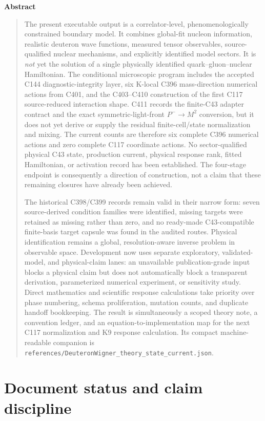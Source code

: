 \documentclass[11pt,oneside]{book}
\newcommand{\codepath}[1]{\nolinkurl{#1}}
\newenvironment{abstract}{%
  \clearpage\begin{center}\Large\bfseries Abstract\end{center}\begin{quote}
}{%
  \end{quote}\clearpage
}
\begin{document}
\begin{abstract}
The present executable output is a correlator-level, phenomenologically constrained boundary model.  It combines global-fit nucleon information, realistic deuteron wave functions, measured tensor observables, source-qualified nuclear mechanisms, and explicitly identified model sectors.  It is \emph{not} yet the solution of a single physically identified quark--gluon--nuclear Hamiltonian.  The conditional microscopic program includes the accepted C144 diagnostic-integrity layer, six K-local C396 mass-direction numerical actions from C401, and the C403--C410 construction of the first C117 source-reduced interaction shape.  C411 records the finite-C43 adapter contract and the exact symmetric-light-front $P^-\to M^2$ conversion, but it does not yet derive or supply the residual finite-cell/state normalization and mixing.  The current counts are therefore six complete C396 numerical actions and zero complete C117 coordinate actions.  No sector-qualified physical C43 state, production current, physical response rank, fitted Hamiltonian, or activation record has been established.  The four-stage endpoint is consequently a direction of construction, not a claim that these remaining closures have already been achieved.

The historical C398/C399 records remain valid in their narrow form: seven source-derived condition families were identified, missing targets were retained as missing rather than zero, and no ready-made C43-compatible finite-basis target capsule was found in the audited routes.  Physical identification remains a global, resolution-aware inverse problem in observable space.  Development now uses separate exploratory, validated-model, and physical-claim lanes: an unavailable publication-grade input blocks a physical claim but does not automatically block a transparent derivation, parameterized numerical experiment, or sensitivity study.  Direct mathematics and scientific response calculations take priority over phase numbering, schema proliferation, mutation counts, and duplicate handoff bookkeeping.  The result is simultaneously a scoped theory note, a convention ledger, and an equation-to-implementation map for the next C117 normalization and K9 response calculation.  Its compact machine-readable companion is \codepath{references/DeuteronWigner_theory_state_current.json}.

\end{abstract}

\chapter*{Document status and claim discipline}
\end{document}
